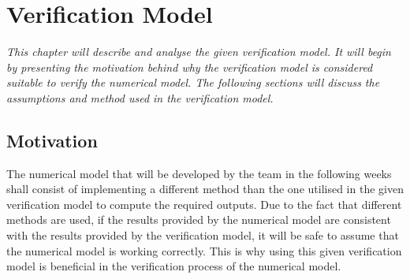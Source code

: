 \section{Verification Model}
\label{sec:verification_model}

\textit{This chapter will describe and analyse the given verification model. It will begin by presenting the motivation behind why the verification model is considered suitable to verify the numerical model. The following sections will discuss the assumptions and method used in the verification model. }

\subsection{Motivation}
The numerical model that will be developed by the team in the following weeks shall consist of implementing a different method than the one utilised in the given verification model to compute the required outputs. Due to the fact that different methods are used, if the results provided by the numerical model are consistent with the results provided by the verification model, it will be safe to assume that the numerical model is working correctly. This is why using this given verification model is beneficial in the verification process of the numerical model.

